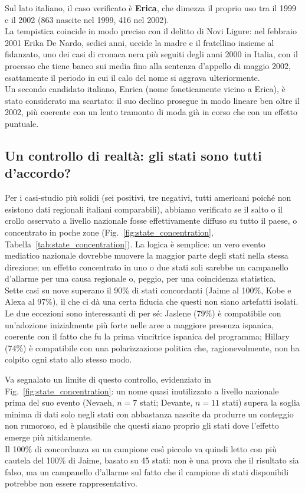 \documentclass[conference]{IEEEtran}
\begin{document}
Sul lato italiano, il caso verificato è \textbf{Erica}, che dimezza il proprio uso tra il 1999 e il
2002 (863 nascite nel 1999, 416 nel 2002). \\
La tempistica coincide in modo preciso con il delitto di
Novi Ligure: nel febbraio 2001 Erika De Nardo, sedici anni, uccide la madre e il fratellino insieme al
fidanzato, uno dei casi di cronaca nera più seguiti degli anni 2000 in Italia, con il processo che
tiene banco sui media fino alla sentenza d'appello di maggio 2002, esattamente il periodo in cui il
calo del nome si aggrava ulteriormente. \\
Un secondo candidato italiano, Enrica (nome foneticamente
vicino a Erica), è stato considerato ma scartato: il suo declino prosegue in modo lineare ben oltre il
2002, più coerente con un lento tramonto di moda già in corso che con un effetto puntuale.



\subsection{Un controllo di realtà: gli stati sono tutti d'accordo?}

Per i casi-studio più solidi (sei positivi, tre negativi, tutti americani poiché non esistono dati
regionali italiani comparabili), abbiamo verificato se il salto o il crollo osservato a livello
nazionale fosse effettivamente diffuso su tutto il paese, o concentrato in poche zone
(Fig.~\ref{fig:state_concentration}, Tabella~\ref{tab:state_concentration}). La logica è semplice:
un vero evento mediatico nazionale dovrebbe muovere la maggior parte degli stati nella stessa
direzione; un effetto concentrato in uno o due stati soli sarebbe un campanello d'allarme per una
causa regionale o, peggio, per una coincidenza statistica. \\
Sette casi su nove superano il 90\% di
stati concordanti (Jaime al 100\%, Kobe e Alexa al 97\%), il che ci dà una certa fiducia che questi non
siano artefatti isolati. \\
Le due eccezioni sono interessanti di per sé: Jaslene (79\%) è compatibile
con un'adozione inizialmente più forte nelle aree a maggiore presenza ispanica, coerente con il fatto
che fu la prima vincitrice ispanica del programma; Hillary (74\%) è compatibile con una polarizzazione
politica che, ragionevolmente, non ha colpito ogni stato allo stesso modo.

Va segnalato un limite di questo controllo, evidenziato in Fig.~\ref{fig:state_concentration}: un
nome quasi inutilizzato a livello nazionale prima del suo evento (Nevaeh, $n=7$ stati; Devante,
$n=11$ stati) supera la soglia minima di dati solo negli stati con abbastanza nascite da produrre un
conteggio non rumoroso, ed è plausibile che questi siano proprio gli stati dove l'effetto emerge più
nitidamente. \\
Il 100\% di concordanza su un campione così piccolo va quindi letto con più cautela del
100\% di Jaime, basato su 45 stati: non è una prova che il risultato sia falso, ma un campanello
d'allarme sul fatto che il campione di stati disponibili potrebbe non essere rappresentativo.
\end{document}
